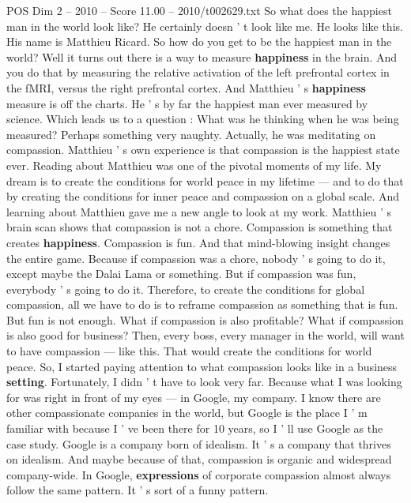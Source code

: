 \begin{textsample}{POS Dim 2 – 2010 – Score 11.00 – 2010/t002629.txt}  \label{ex:f2_pos_076}
So what does the happiest man in the world look like?
He certainly doesn ' t look like me.
He looks like this.
His name is Matthieu Ricard.
So how do you get to be the happiest man in the world?
Well it turns out there is a way to measure \textbf{happiness} in the brain.
And you do that by measuring the relative activation of the left prefrontal cortex in the fMRI, versus the right prefrontal cortex.
And Matthieu ' s \textbf{happiness} measure is off the charts.
He ' s by far the happiest man ever measured by science.
Which leads us to a question : What was he thinking when he was being measured?
Perhaps something very naughty.
Actually, he was meditating on compassion.
Matthieu ' s own experience is that compassion is the happiest state ever.
Reading about Matthieu was one of the pivotal moments of my life.
My dream is to create the conditions for world peace in my lifetime — and to do that by creating the conditions for inner peace and compassion on a global scale.
And learning about Matthieu gave me a new angle to look at my work.
Matthieu ' s brain scan shows that compassion is not a chore.
Compassion is something that creates \textbf{happiness}.
Compassion is fun.
And that mind-blowing insight changes the entire game.
Because if compassion was a chore, nobody ' s going to do it, except maybe the Dalai Lama or something.
But if compassion was fun, everybody ' s going to do it.
Therefore, to create the conditions for global compassion, all we have to do is to reframe compassion as something that is fun.
But fun is not enough.
What if compassion is also profitable?
What if compassion is also good for business?
Then, every boss, every manager in the world, will want to have compassion — like this.
That would create the conditions for world peace.
So, I started paying attention to what compassion looks like in a business \textbf{setting}.
Fortunately, I didn ' t have to look very far.
Because what I was looking for was right in front of my eyes — in Google, my company.
I know there are other compassionate companies in the world, but Google is the place I ' m familiar with because I ' ve been there for 10 years, so I ' ll use Google as the case study.
Google is a company born of idealism.
It ' s a company that thrives on idealism.
And maybe because of that, compassion is organic and widespread company-wide.
In Google, \textbf{expressions} of corporate compassion almost always follow the same pattern.
It ' s sort of a funny pattern.

\end{textsample}
